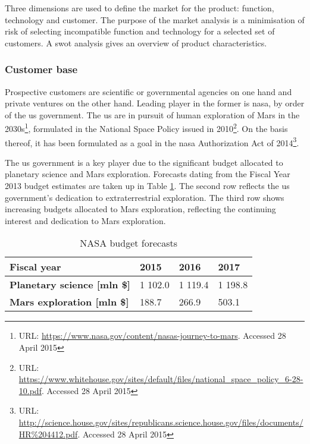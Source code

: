 Three dimensions are used to define the market for the product: function, technology and customer. The purpose of the market analysis is a minimisation of risk of selecting incompatible function and technology for a selected set of customers. A \gls{swot} analysis gives an overview of product characteristics.

\subsubsection{Customer base}
Prospective customers are scientific or governmental agencies on one hand and private ventures on the other hand. Leading player in the former is \gls{nasa}, by order of the \gls{us} government. The \gls{us} are in pursuit of human exploration of Mars in the 2030s\footnote{URL: \url{https://www.nasa.gov/content/nasas-journey-to-mars}.  Accessed 28 April 2015}, formulated in the National Space Policy issued in 2010\footnote{URL: \url{https://www.whitehouse.gov/sites/default/files/national\_space\_policy\_6-28-10.pdf}. Accessed 28 April 2015}. On the basis thereof, it has been formulated as a goal in the \gls{nasa} Authorization Act of 2014\footnote{URL: \url{http://science.house.gov/sites/republicans.science.house.gov/files/documents/HR\%204412.pdf}. Accessed 28 April 2015}.

The \gls{us} government is a key player due to the significant budget allocated to planetary science and Mars exploration. Forecasts dating from the Fiscal Year 2013 budget estimates \cite{NASA2014a} are taken up in Table \ref{tab:cashbudgets}. The second row reflects the \gls{us} government's dedication to extraterrestrial exploration. The third row shows increasing budgets allocated to Mars exploration, reflecting the continuing interest and dedication to Mars exploration.

\begin{table}[h]
\centering
\caption{NASA budget forecasts}
\label{tab:cashbudgets}
\begin{tabular}{|l|l|l|l|}
\hline
{\bf Fiscal year}                    & 2015     & 2016    & 2017    \\ \hline
{\bf Planetary science {[}mln \${]}} & 1 102.0 & 1 119.4 & 1 198.8 \\ \hline
{\bf Mars exploration {[}mln \${]}}  & 188.7   & 266.9   & 503.1   \\ \hline
\end{tabular}
\end{table}

